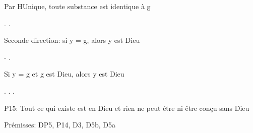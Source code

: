 \documentclass[10pt]{report}
\begin{document}
\begin{coqdoccode}
\coqdocindent{2.00em}
\begin{coqdoccomment}
\coqdocindent{0.50em}
Par\coqdocindent{0.50em}
HUnique,\coqdocindent{0.50em}
toute\coqdocindent{0.50em}
substance\coqdocindent{0.50em}
est\coqdocindent{0.50em}
identique\coqdocindent{0.50em}
à\coqdocindent{0.50em}
g\coqdocindent{0.50em}
\end{coqdoccomment}
\coqdoceol
\coqdocindent{2.00em}
 .\coqdoceol
\coqdocindent{2.00em}
 .\coqdoceol
\coqdocemptyline
\coqdocindent{1.00em}
\begin{coqdoccomment}
\coqdocindent{0.50em}
Seconde\coqdocindent{0.50em}
direction:\coqdocindent{0.50em}
si\coqdocindent{0.50em}
y\coqdocindent{0.50em}
=\coqdocindent{0.50em}
g,\coqdocindent{0.50em}
alors\coqdocindent{0.50em}
y\coqdocindent{0.50em}
est\coqdocindent{0.50em}
Dieu\coqdocindent{0.50em}
\end{coqdoccomment}
\coqdoceol
\coqdocindent{1.00em}
-  .\coqdoceol
\coqdocindent{2.00em}
\begin{coqdoccomment}
\coqdocindent{0.50em}
Si\coqdocindent{0.50em}
y\coqdocindent{0.50em}
=\coqdocindent{0.50em}
g\coqdocindent{0.50em}
et\coqdocindent{0.50em}
g\coqdocindent{0.50em}
est\coqdocindent{0.50em}
Dieu,\coqdocindent{0.50em}
alors\coqdocindent{0.50em}
y\coqdocindent{0.50em}
est\coqdocindent{0.50em}
Dieu\coqdocindent{0.50em}
\end{coqdoccomment}
\coqdoceol
\coqdocindent{2.00em}
 .\coqdoceol
\coqdocindent{2.00em}
 .\coqdoceol
\coqdocnoindent
{}.\coqdoceol
\coqdocemptyline
\coqdocnoindent
\begin{coqdoccomment}
\coqdocindent{0.50em}
P15:\coqdocindent{0.50em}
Tout\coqdocindent{0.50em}
ce\coqdocindent{0.50em}
qui\coqdocindent{0.50em}
existe\coqdocindent{0.50em}
est\coqdocindent{0.50em}
en\coqdocindent{0.50em}
Dieu\coqdocindent{0.50em}
et\coqdocindent{0.50em}
rien\coqdocindent{0.50em}
ne\coqdocindent{0.50em}
peut\coqdocindent{0.50em}
être\coqdocindent{0.50em}
ni\coqdocindent{0.50em}
être\coqdocindent{0.50em}
conçu\coqdocindent{0.50em}
sans\coqdocindent{0.50em}
Dieu\coqdocindent{0.50em}
\end{coqdoccomment}
\coqdoceol
\coqdocnoindent
\begin{coqdoccomment}
\coqdocindent{0.50em}
Prémisses:\coqdocindent{0.50em}
DP5,\coqdocindent{0.50em}
P14,\coqdocindent{0.50em}
D3,\coqdocindent{0.50em}
D5b,\coqdocindent{0.50em}
D5a\coqdocindent{0.50em}

\end{coqdoccomment}
\end{coqdoccode}
\end{document}
